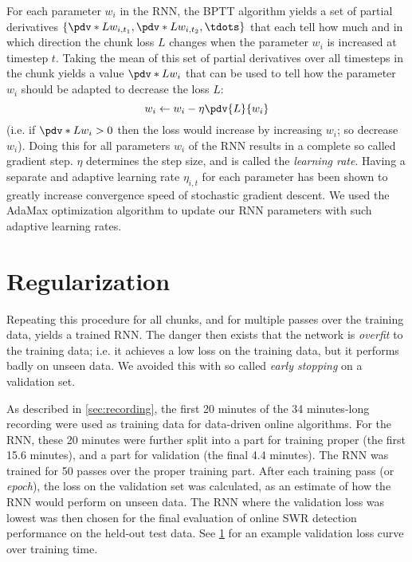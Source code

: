 For each parameter $w_i$ in the RNN, the BPTT algorithm yields a set of partial derivatives $\{ \pdv*{L}{w_{i,t_1}}, \pdv*{L}{w_{i,t_2}}, \tdots \}$ that each tell how much and in which direction the chunk loss $L$ changes when the parameter $w_i$ is increased at timestep $t$. Taking the mean of this set of partial derivatives over all timesteps in the chunk yields a value $\pdv*{L}{w_i}$ that can be used to tell how the parameter $w_i$ should be adapted to decrease the loss $L$:
%
\begin{equation}
\label{eq:SGD}
w_i \leftarrow w_i - \eta \pdv{L}{w_i}
\end{equation}
%
(i.e. if $\pdv*{L}{w_i} > 0$ then the loss would increase by increasing $w_i$; so decrease $w_i$). Doing this for all parameters $w_i$ of the RNN results in a complete so called gradient step. $\eta$ determines the step size, and is called the \emph{learning rate}. Having a separate and adaptive learning rate $\eta_{i,t}$ for each parameter has been shown to greatly increase convergence speed of stochastic gradient descent. We used the AdaMax optimization algorithm \cite{Kingma2014} to update our RNN parameters with such adaptive learning rates.



\section{Regularization}
\label{sec:RNN-regularization}

Repeating this procedure for all chunks, and for multiple passes over the training data, yields a trained RNN. The danger then exists that the network is \emph{overfit} to the training data; i.e. it achieves a low loss on the training data, but it performs badly on unseen data. We avoided this with so called \emph{early stopping} on a validation set.

As described in \cref{sec:recording}, the first 20 minutes of the 34 minutes-long recording were used as training data for data-driven online algorithms. For the RNN, these 20 minutes were further split into a part for training proper (the first 15.6 minutes), and a part for validation (the final 4.4 minutes). The RNN was trained for 50 passes over the proper training part. After each training pass (or \emph{epoch}), the loss on the validation set was calculated, as an estimate of how the RNN would perform on unseen data. The RNN where the validation loss was lowest was then chosen for the final evaluation of online SWR detection performance on the held-out test data. See \cref{fig:validloss} for an example validation loss curve over training time.

\begin{figure}
\label{fig:validloss}
\end{figure}

